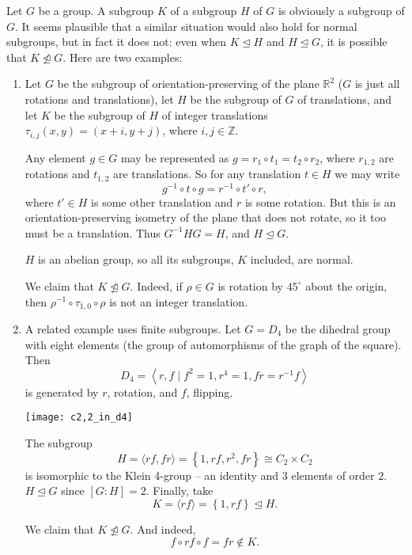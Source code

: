 \documentclass[12pt]{article}
\newcommand{\Ints}{\mathbb{Z}}
\newcommand{\Reals}{\mathbb{R}}
\newcommand{\normal}{\trianglelefteq}
\newcommand{\notnormal}{\ntrianglelefteq}
\begin{document}

Let $G$ be a group.
A subgroup $K$ of a subgroup $H$ of $G$ is obviously a subgroup of $G$.
It seems plausible that a similar situation would also hold for normal subgroups, but in fact it does not:
even when $K\normal H$ and $H\normal G$, it is possible that $K\notnormal G$.  Here are two examples:
\begin{enumerate}
\item
Let $G$ be the subgroup of orientation-preserving  of the plane $\Reals^2$ ($G$ is just all rotations and translations), let $H$ be the subgroup of $G$ of translations, and let $K$ be the subgroup of $H$ of integer translations $\tau_{i,j}(x,y)=(x+i,y+j)$, where $i,j\in\Ints$.

Any element $g\in G$ may be represented as $g=r_1\circ t_1=t_2\circ r_2$, where $r_{1,2}$ are rotations and $t_{1,2}$ are translations.  So for any translation $t\in H$ we may write
$$
g^{-1}\circ t\circ g = r^{-1}\circ t'\circ r,
$$
where $t'\in H$ is some other translation and $r$ is some rotation.  But this is an orientation-preserving isometry of the plane that does not rotate, so it too must be a translation.  Thus $G^{-1}HG=H$, and $H\normal G$.

$H$ is an abelian group, so all its subgroups, $K$ included, are normal.

We claim that $K\notnormal G$.  Indeed, if $\rho\in G$ is rotation by $45^{\circ}$ about the origin, then $\rho^{-1}\circ \tau_{1,0}\circ \rho$ is not an integer translation.

\item
A related example uses finite subgroups.  Let $G=D_4$ be the dihedral group with eight elements (the group of automorphisms of the graph of the square).  Then
$$
D_4=\left\langle r,f \mid f^2=1, r^4=1, fr=r^{-1}f \right\rangle
$$
is generated by $r$, rotation, and $f$, flipping.

\begin{center}
\texttt{[image: c2,2\_in\_d4]}
\end{center}

The subgroup
$$
H = \langle rf, fr\rangle = \left\{ 1, rf, r^2, fr \right\} \cong C_2\times C_2
$$
is isomorphic to the Klein 4-group -- an identity and 3 elements of order 2.  $H\normal G$ since $[G:H] = 2$.  Finally, take
$$
K = \langle rf \rangle = \left\{ 1, rf \right\} \normal H.
$$

We claim that $K\notnormal G$.  And indeed,
$$
f\circ rf \circ f = fr \notin K.
$$
\end{enumerate}
\end{document}
